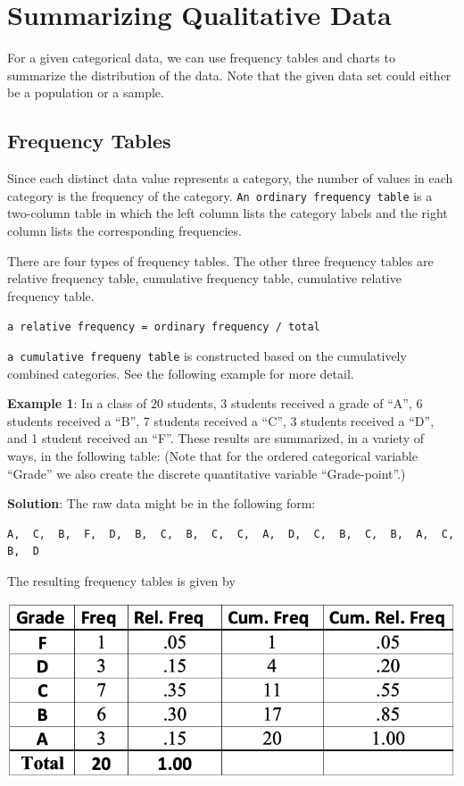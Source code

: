 \documentclass[
]{book}
\begin{document}
\hypertarget{summarizing-qualitative-data}{%
\section{Summarizing Qualitative Data}\label{summarizing-qualitative-data}}

For a given categorical data, we can use frequency tables and charts to summarize the distribution of the data. Note that the given data set could either be a population or a sample.

\hypertarget{frequency-tables}{%
\subsection{Frequency Tables}\label{frequency-tables}}

Since each distinct data value represents a category, the number of values in each category is the frequency of the category. \texttt{An\ ordinary\ frequency\ table} is a two-column table in which the left column lists the category labels and the right column lists the corresponding frequencies.

There are four types of frequency tables. The other three frequency tables are relative frequency table, cumulative frequency table, cumulative relative frequency table.

\texttt{a\ relative\ frequency\ =\ ordinary\ frequency\ /\ total}

\texttt{a\ cumulative\ frequeny\ table} is constructed based on the cumulatively combined categories. See the following example for more detail.

\textbf{Example 1}: In a class of 20 students, 3 students received a grade of ``A'', 6 students received a ``B'', 7 students received a ``C'', 3 students received a ``D'', and 1 student received an ``F''. These results are summarized, in a variety of ways, in the following table: (Note that for the ordered categorical variable ``Grade'' we also create the discrete quantitative variable ``Grade-point''.)

\textbf{Solution}: The raw data might be in the following form:

\begin{verbatim}
A,  C,  B,  F,  D,  B,  C,  B,  C,  C,  A,  D,  C,  B,  C,  B,  A,  C,  B,  D
\end{verbatim}

The resulting frequency tables is given by

\begin{center}\includegraphics[width=0.6\linewidth]{week01/Grade-Freq-Table} \end{center}
\end{document}
